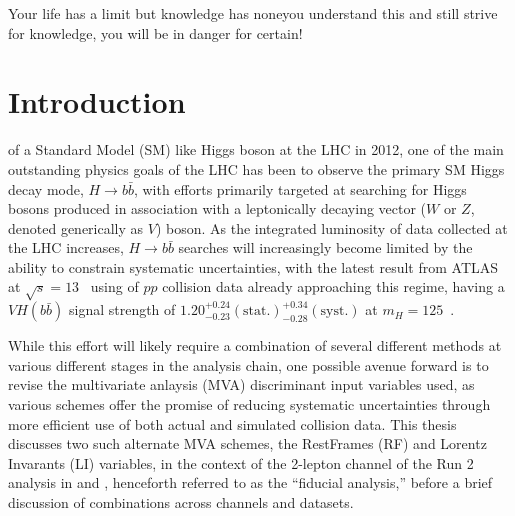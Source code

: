 \begin{savequote}[75mm]
Your life has a limit but knowledge has none\ldotsif you understand this and still strive for knowledge, you will be in danger for certain!
\end{savequote}

\chapter{Introduction}

 of a Standard Model (SM) like Higgs boson at the LHC in 2012\cite{:2012gk}\cite{:2012gu}, one of the main outstanding physics goals of the LHC has been to observe the primary SM Higgs decay mode, $H\to b\bar{b}$, with efforts primarily targeted at searching for Higgs bosons produced in association with a leptonically decaying vector ($W$ or $Z$, denoted generically as $V$) boson.  As the integrated luminosity of data collected at the LHC increases, $H\to b\bar{b}$ searches will increasingly become limited by the ability to constrain systematic uncertainties, with the latest result from ATLAS at $\sqrt{s}=13$ \TeV\, using \LUMI of $pp$ collision data already approaching this regime, having a $VH\left(b\bar{b}\right)$ signal strength of $1.20^{+0.24}_{-0.23}(\textrm{stat.})^{+0.34}_{-0.28}(\textrm{syst.})$ at $m_{H}=125$ \GeV\,\cite{paper}.

While this effort will likely require a combination of several different methods at various different stages in the analysis chain, one possible avenue forward is to revise the multivariate anlaysis (MVA) discriminant input variables used, as various schemes offer the promise of reducing systematic uncertainties through more efficient use of both actual and simulated collision data.  This thesis discusses two such alternate MVA schemes, the RestFrames (RF) and Lorentz Invarants (LI) variables, in the context of the 2-lepton channel of the Run 2 analysis in \cite{paper} and \cite{supportnote}, henceforth referred to as the ``fiducial analysis,'' before a brief discussion of combinations across channels and datasets.



